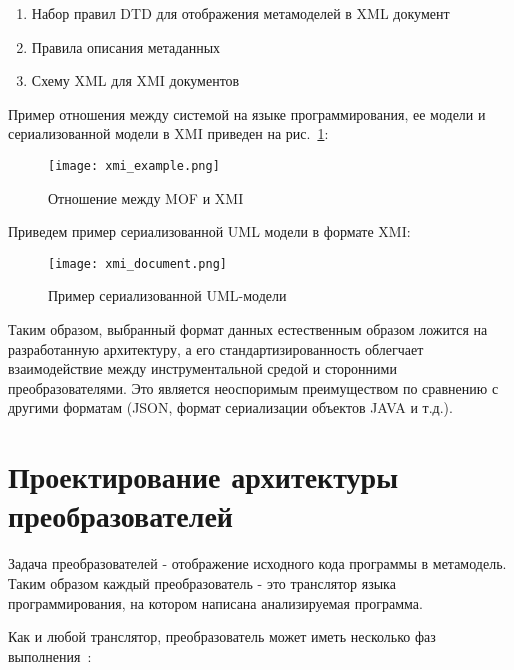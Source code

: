 \begin{enumerate}
    \item Набор правил DTD для отображения метамоделей в XML документ
    \item Правила описания метаданных
    \item Схему XML для XMI документов
\end{enumerate}

Пример отношения между системой на языке программирования, ее модели и сериализованной
модели в XMI приведен на рис.~\ref{fig:xmi_example}:

\begin{figure}[!ht]
    \begin{center}
        \texttt{[image: xmi\_example.png]}
    \end{center}
    \caption{Отношение между MOF и XMI}
    \label{fig:xmi_example}
\end{figure}

Приведем пример сериализованной UML модели в формате XMI:

\begin{figure}[H]
    \begin{center}
        \texttt{[image: xmi\_document.png]}
    \end{center}
    \caption{Пример сериализованной UML-модели}
    \label{fig:xmi_document}
\end{figure}

Таким образом, выбранный формат данных естественным образом ложится на
разработанную архитектуру, а его стандартизированность облегчает взаимодействие
между инструментальной средой и сторонними преобразователями. Это является
неоспоримым преимуществом по сравнению с другими форматам (JSON, формат
сериализации объектов JAVA и т.д.).

\section{Проектирование архитектуры преобразователей}
\label{sec:transformer_architerture}

Задача преобразователей - отображение исходного кода программы в метамодель.
Таким образом каждый преобразователь - это транслятор языка программирования, на
котором написана анализируемая программа.

Как и любой транслятор, преобразователь может иметь несколько фаз
выполнения~\cite{Aho1986}:

